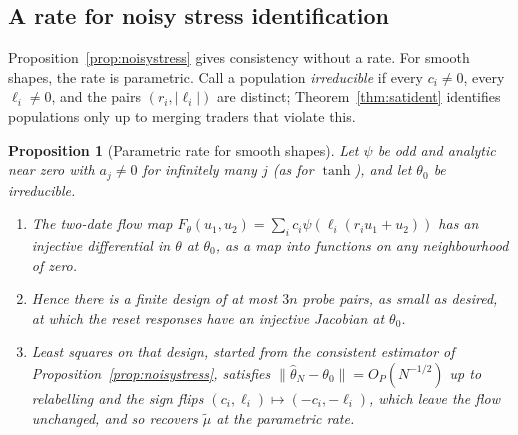 \documentclass[12pt]{article}
\newtheorem{proposition}[theorem]{Proposition}
\theoremstyle{definition}
\theoremstyle{remark}
\begin{document}
\subsection{A rate for noisy stress identification}

Proposition~\ref{prop:noisystress} gives consistency without a rate. For smooth shapes, the rate is parametric. Call a population \emph{irreducible} if every $c_i\ne0$, every $\ell_i\ne0$, and the pairs $(r_i,|\ell_i|)$ are distinct; Theorem~\ref{thm:satident} identifies populations only up to merging traders that violate this.

\begin{proposition}[Parametric rate for smooth shapes]\label{prop:stressrate}
Let $\psi$ be odd and analytic near zero with $a_j\ne0$ for infinitely many $j$ (as for $\tanh$), and let $\theta_0$ be irreducible.
\begin{enumerate}[label=(\roman*),itemsep=1pt]
\item The two-date flow map $F_\theta(u_1,u_2)=\sum_ic_i\psi(\ell_i(r_iu_1+u_2))$ has an injective differential in $\theta$ at $\theta_0$, as a map into functions on any neighbourhood of zero.
\item Hence there is a finite design of at most $3n$ probe pairs, as small as desired, at which the reset responses have an injective Jacobian at $\theta_0$.
\item Least squares on that design, started from the consistent estimator of Proposition~\ref{prop:noisystress}, satisfies $\|\hat\theta_N-\theta_0\|=O_P(N^{-1/2})$ up to relabelling and the sign flips $(c_i,\ell_i)\mapsto(-c_i,-\ell_i)$, which leave the flow unchanged, and so recovers $\tilde\mu$ at the parametric rate.
\end{enumerate}
\end{proposition}
\end{document}
